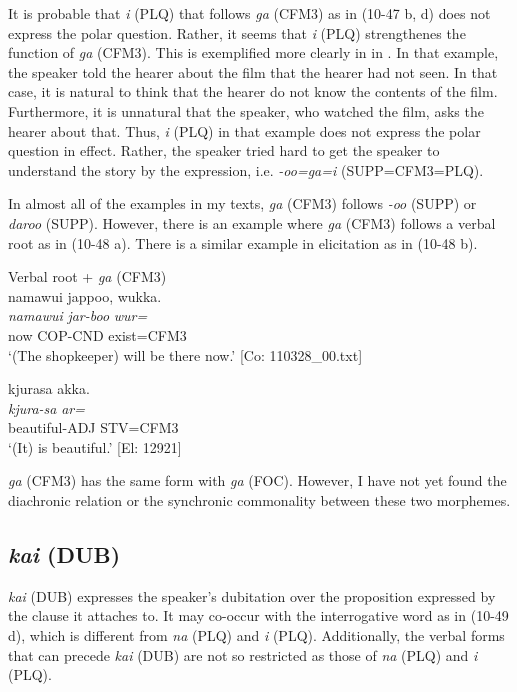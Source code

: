 It is probable that \textit{i} (PLQ) that follows \textit{ga} (CFM3) as in (10-47 b, d) does not express the polar question. Rather, it seems that \textit{i} (PLQ) strengthenes the function of \textit{ga} (CFM3). This is exemplified more clearly in  in . In that example, the speaker told the hearer about the film that the hearer had not seen. In that case, it is natural to think that the hearer do not know the contents of the film. Furthermore, it is unnatural that the speaker, who watched the film, asks the hearer about that. Thus, \textit{i} (PLQ) in that example does not express the polar question in effect. Rather, the speaker tried hard to get the speaker to understand the story by the expression, i.e. \textit{{}-oo=ga=i} (SUPP=CFM3=PLQ).

In almost all of the examples in my texts, \textit{ga} (CFM3) follows \textit{-oo} (SUPP) or \textit{daroo} (SUPP). However, there is an example where \textit{ga} (CFM3) follows a verbal root as in (10-48 a). There is a similar example in elicitation as in (10-48 b).

\ea\label{ex:10.48}   Verbal root + \textit{ga} (CFM3)\\
  \ea  %
      \glll    namawui  jappoo,  wukka.\\
      \textit{namawui}  \textit{jar-boo}  \textit{wur=}\\
      now  COP-CND  exist=CFM3\\
      \glt       ‘(The shopkeeper) will be there now.’ [Co: 110328\_00.txt]

  \ex  %
      \glll    kjurasa  akka.\\
      \textit{kjura-sa}  \textit{ar=}\\
      beautiful-ADJ  STV=CFM3\\
      \glt       ‘(It) is beautiful.’ [El: 12921]
    \z
\z

  \textit{ga} (CFM3) has the same form with \textit{ga} (FOC). However, I have not yet found the diachronic relation or the synchronic commonality between these two morphemes.

\subsection{\textit{kai} (DUB)}\label{sec:10.3.6}

\textit{kai} (DUB) expresses the speaker’s dubitation over the proposition expressed by the clause it attaches to. It may co-occur with the interrogative word as in (10-49 d), which is different from \textit{na} (PLQ) and \textit{i} (PLQ). Additionally, the verbal forms that can precede \textit{kai} (DUB) are not so restricted as those of \textit{na} (PLQ) and \textit{i} (PLQ).

